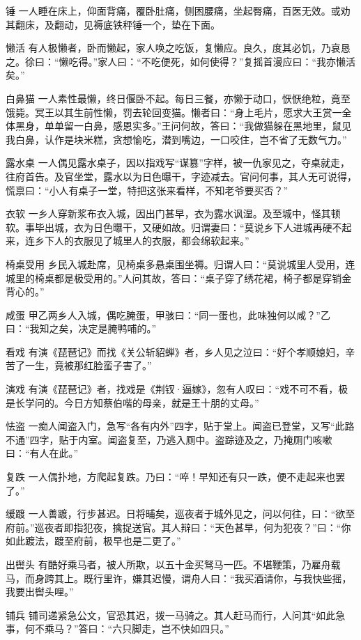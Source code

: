 \documentclass[12pt,UTF8]{ctexbook}
\begin{document}
锤
一人睡在床上，仰面背痛，覆卧肚痛，侧困腰痛，坐起臀痛，百医无效。或劝其翻床，及翻动，见褥底铁秤锤一个，垫在下面。

懒活
有人极懒者，卧而懒起，家人唤之吃饭，复懒应。良久，度其必饥，乃哀恳之。徐曰：“懒吃得。”家人曰：“不吃便死，如何使得？”复摇首漫应曰：“我亦懒活矣。”

白鼻猫
一人素性最懒，终日偃卧不起。每日三餐，亦懒于动口，恹恹绝粒，竟至饿毙。冥王以其生前性懒，罚去轮回变猫。懒者曰：“身上毛片，愿求大王赏一全体黑身，单单留一白鼻，感恩实多。”王问何故，答曰：“我做猫躲在黑地里，鼠见我白鼻，认作是块米糕，贪想愉吃，潜到嘴边，一口咬住，岂不省了无数气力。”

露水桌
一人偶见露水桌子，因以指戏写“谋篡”字样，被一仇家见之，夺桌就走，往府首告。及官坐堂，露水以为日色曝干，字迹减去。官问何事，其人无可说得，慌禀曰：“小人有桌子一堂，特把这张来看样，不知老爷要买否？”

衣软
一乡人穿新浆布衣入城，因出门甚早，衣为露水讽湿。及至城中，怪其顿软。事毕出城，衣为日色曝干，又硬如故。归谓妻曰：“莫说乡下人进城再硬不起来，连乡下人的衣服见了城里人的衣服，都会绵软起来。”

椅桌受用
乡民入城赴席，见椅桌多悬桌围坐褥。归谓人曰：“莫说城里人受用，连城里的椅桌都是极受用的。”人问其故，答曰：“桌子穿了绣花裙，椅子都是穿销金背心的。”

咸蛋
甲乙两乡人入城，偶吃腌蛋，甲骇曰：“同一蛋也，此味独何以咸？”乙曰：“我知之矣，决定是腌鸭哺的。”

看戏
有演《琵琶记》而找《关公斩貂蝉》者，乡人见之泣曰：“好个孝顺媳妇，辛苦了一生，竟被那红脸蛮子害了。”

演戏
有演《琵琶记》者，找戏是《荆钗·逼嫁》，忽有人叹曰：“戏不可不看，极是长学问的。今日方知蔡伯喈的母亲，就是王十朋的丈母。”

怯盗
一痴人闻盗入门，急写“各有内外”四字，贴于堂上。闻盗已登堂，又写“此路不通”四字，贴于内室。闻盗复至，乃逃入厕中。盗踪迹及之，乃掩厕门咳嗽曰：“有人在此。”

复跌
一人偶扑地，方爬起复跌。乃曰：“啐！早知还有只一跌，便不走起来也罢了。”

缓踱
一人善踱，行步甚迟。日将晡矣，巡夜者于城外见之，问以何往，曰：“欲至府前。”巡夜者即指犯夜，擒捉送官。其人辩曰：“天色甚早，何为犯夜？”曰：“你如此踱法，踱至府前，极早也是二更了。”

出辔头
有酷好乘马者，被人所欺，以五十金买驽马一匹。不堪鞭策，乃雇舟载马，而身跨其上。既行里许，嫌其迟慢，谓舟人曰：“我买酒请你，与我快些摇，我要出辔头哩。”

铺兵
铺司递紧急公文，官恐其迟，拨一马骑之。其人赶马而行，人问其“如此急事，何不乘马？”答曰：“六只脚走，岂不快如四只。”
\end{document}
